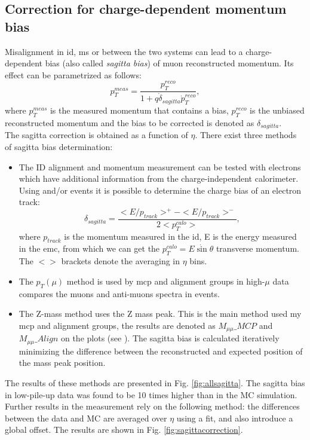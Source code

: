 	\subsection{Correction for charge-dependent momentum bias}
    Misalignment in \gls{id}, \gls{ms} or between the two systems can lead to a charge-dependent bias (also called \textit{sagitta bias}) of muon reconstructed momentum. Its effect can be parametrized as follows:
    \begin{equation}
    	p_T^{meas}=\frac{p_T^{reco}}{1+q\dot \delta_{sagitta}\dot p_T^{reco}},
    \end{equation}
    where $p_T^{meas}$ is the measured momentum that contains a bias, $p_T^{reco}$ is the unbiased reconstructed momentum and the bias to be corrected is denoted as $\delta_{sagitta}$.\\
    The sagitta correction is obtained as a function of $\eta$. There exist three methods of sagitta bias determination:
    \begin{itemize}
    	\item The ID alignment and momentum measurement can be tested with electrons which have additional information from the charge-independent calorimeter. Using \Zee and/or \Wenu events it is possible to determine the charge bias of an electron track:
    	\begin{equation}
    		\delta_{sagitta}=\frac{<E/p_{track}>^+-<E/p_{track}>^-}{2<p^{calo}_T>},
    	\end{equation}
    	where $p_{track}$ is the momentum measured in the \gls{id}, E is the energy measured in the \gls{emc}, from which we can get the $p^{calo}_T=E\dot \sin{\theta}$ transverse momentum. The $<>$ brackets denote the averaging in $\eta$ bins. 
    	\item The $p_T(\mu)$ method is used by \gls{mcp} and alignment groups in high-$\mu$ data compares the muons and anti-muons spectra in \Zmm events.
    	\item The Z-mass method uses the Z mass peak. This is the main method used my \gls{mcp} and alignment groups, the results are denoted as $M_{\mu\mu}\_MCP$ and $M_{\mu\mu}\_Align$ on the plots (see \cite{muon_align}). The sagitta bias is calculated iteratively minimizing the difference between the reconstructed and expected position of the \Zmm mass peak position.
    \end{itemize}
	The results of these methods are presented in Fig. \ref{fig:allsagitta}. The sagitta bias in low-pile-up data was found to be 10 times higher than in the MC simulation. Further results in the measurement rely on the following method: the differences between the data and MC are averaged over $\eta$ using a fit, and also introduce a global offset. The results are shown in Fig. \ref{fig:sagittacorrection}.
	
